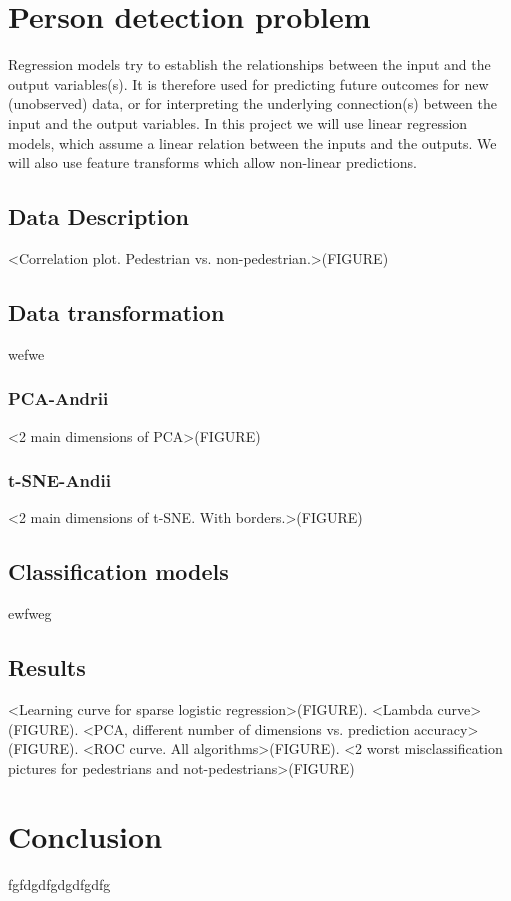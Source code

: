 \documentclass{article} %
\begin{document}
\section{Person detection problem}

Regression models try to establish the relationships between the input and the output variables(s). It is therefore used for predicting future outcomes for new (unobserved) data, or for interpreting the underlying connection(s) between the input and the output variables. In this project we will use linear regression models, which assume a linear relation between the inputs and the outputs. We will also use feature transforms which allow non-linear predictions.

\subsection{Data Description}

<Correlation plot. Pedestrian vs. non-pedestrian.>(FIGURE)

\subsection{Data transformation}

wefwe

\subsubsection{PCA-Andrii}

<2 main dimensions of PCA>(FIGURE)

\subsubsection{t-SNE-Andii}

<2 main dimensions of t-SNE. With borders.>(FIGURE)

\subsection{Classification models}

ewfweg

\subsection{Results}

<Learning curve for sparse logistic regression>(FIGURE). <Lambda curve>(FIGURE). <PCA, different number of dimensions vs. prediction accuracy>(FIGURE). <ROC curve. All algorithms>(FIGURE). <2 worst misclassification pictures for pedestrians and not-pedestrians>(FIGURE)



\section{Conclusion}

fgfdgdfgdgdfgdfg
\end{document}
